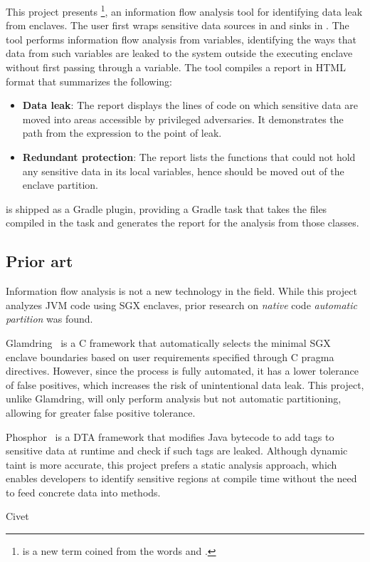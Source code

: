 This project presents \pname{}
\footnote{ is a new term coined from the words  and .},
an information flow analysis tool
for identifying data leak from enclaves.
The user first wraps sensitive data sources in  and sinks in .
The tool performs information flow analysis from  variables,
identifying the ways that data from such variables are leaked
to the system outside the executing enclave
without first passing through a  variable.
The tool compiles a report in HTML format that summarizes the following:
\begin{itemize}
	\item \textbf{Data leak}:
		The report displays the lines of code on which sensitive data are moved
		into areas accessible by privileged adversaries.
		It demonstrates the path from the  expression to the point of leak.
	\item \textbf{Redundant protection}:
		The report lists the functions that could not hold any sensitive data in its local variables,
		hence should be moved out of the enclave partition.
\end{itemize}

\pname{} is shipped as a Gradle plugin,
providing a Gradle task that
takes the  files compiled in the  task
and generates the report for the analysis from those classes.

\subsection{Prior art}\label{subsec:prior-art}
Information flow analysis is not a new technology in the field.
While this project analyzes \ac{JVM} code using \ac{SGX} enclaves,
prior research on \emph{native} code \emph{automatic partition} was found.

Glamdring~\cite{glamdring} is a C framework that
automatically selects the minimal \ac{SGX} enclave boundaries
based on user requirements specified through C pragma directives.
However, since the process is fully automated,
it has a lower tolerance of false positives,
which increases the risk of unintentional data leak.
This project, unlike Glamdring, will only perform analysis but not automatic partitioning,
allowing for greater false positive tolerance.

Phosphor~\cite{BellJonathan2014Pidd} is a \ac{DTA} framework
that modifies Java bytecode to add tags to sensitive data at runtime
and check if such tags are leaked.
Although dynamic taint is more accurate,
this project prefers a static analysis approach,
which enables developers to identify sensitive regions at compile time
without the need to feed concrete data into methods.

Civet~\cite{civet} %
